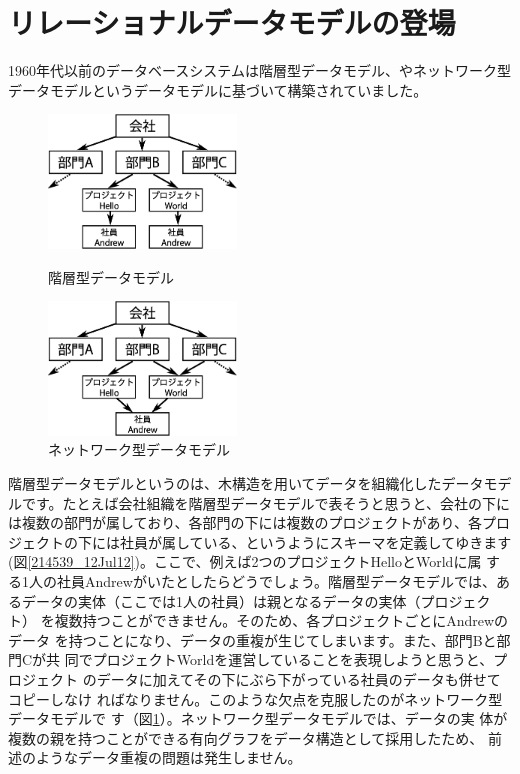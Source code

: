 \section{リレーショナルデータモデルの登場}

1960年代以前のデータベースシステムは階層型データモデル、やネットワーク型
データモデルというデータモデルに基づいて構築されていました。

\begin{figure}[tb]
 \begin{minipage}{0.48\textwidth}
  \begin{center}
   \includegraphics[width=5cm]{hayamiz/images/hierarchical-data-model.eps}
   \caption{階層型データモデル}
   \label{214539_12Jul12}
  \end{center}
 \end{minipage}
 \begin{minipage}{0.48\textwidth}
  \begin{center}
   \includegraphics[width=5cm]{hayamiz/images/network-data-model.eps}
   \caption{ネットワーク型データモデル}
   \label{214707_12Jul12}
  \end{center}
 \end{minipage}
\end{figure}

階層型データモデルというのは、木構造を用いてデータを組織化したデータモデ
ルです。たとえば会社組織を階層型データモデルで表そうと思うと、会社の下に
は複数の部門が属しており、各部門の下には複数のプロジェクトがあり、各プロ
ジェクトの下には社員が属している、というようにスキーマを定義してゆきます
(図\ref{214539_12Jul12})。ここで、例えば2つのプロジェクトHelloとWorldに属
する1人の社員Andrewがいたとしたらどうでしょう。階層型データモデルでは、あ
るデータの実体（ここでは1人の社員）は親となるデータの実体（プロジェクト）
を複数持つことができません。そのため、各プロジェクトごとにAndrewのデータ
を持つことになり、データの重複が生じてしまいます。また、部門Bと部門Cが共
同でプロジェクトWorldを運営していることを表現しようと思うと、プロジェクト
のデータに加えてその下にぶら下がっている社員のデータも併せてコピーしなけ
ればなりません。このような欠点を克服したのがネットワーク型データモデルで
す（図\ref{214707_12Jul12}）。ネットワーク型データモデルでは、データの実
体が複数の親を持つことができる有向グラフをデータ構造として採用したため、
前述のようなデータ重複の問題は発生しません。

